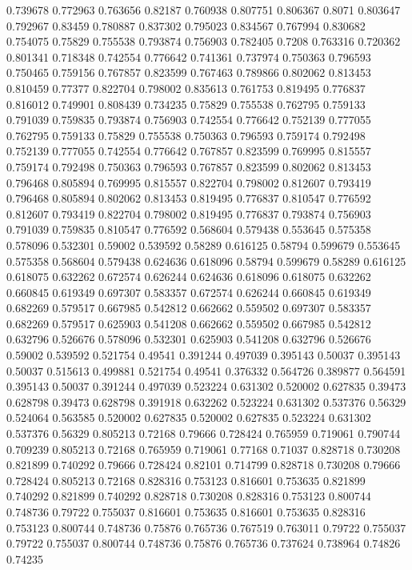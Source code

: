 0.739678 0.772963
0.763656 0.82187
0.760938 0.807751
0.806367 0.8071
0.803647 0.792967
0.83459 0.780887
0.837302 0.795023
0.834567 0.767994
0.830682 0.754075
0.75829 0.755538
0.793874 0.756903
0.782405 0.7208
0.763316 0.720362
0.801341 0.718348
0.742554 0.776642
0.741361 0.737974
0.750363 0.796593
0.750465 0.759156
0.767857 0.823599
0.767463 0.789866
0.802062 0.813453
0.810459 0.77377
0.822704 0.798002
0.835613 0.761753
0.819495 0.776837
0.816012 0.749901
0.808439 0.734235
0.75829 0.755538
0.762795 0.759133
0.791039 0.759835
0.793874 0.756903
0.742554 0.776642
0.752139 0.777055
0.762795 0.759133
0.75829 0.755538
0.750363 0.796593
0.759174 0.792498
0.752139 0.777055
0.742554 0.776642
0.767857 0.823599
0.769995 0.815557
0.759174 0.792498
0.750363 0.796593
0.767857 0.823599
0.802062 0.813453
0.796468 0.805894
0.769995 0.815557
0.822704 0.798002
0.812607 0.793419
0.796468 0.805894
0.802062 0.813453
0.819495 0.776837
0.810547 0.776592
0.812607 0.793419
0.822704 0.798002
0.819495 0.776837
0.793874 0.756903
0.791039 0.759835
0.810547 0.776592
0.568604 0.579438
0.553645 0.575358
0.578096 0.532301
0.59002 0.539592
0.58289 0.616125
0.58794 0.599679
0.553645 0.575358
0.568604 0.579438
0.624636 0.618096
0.58794 0.599679
0.58289 0.616125
0.618075 0.632262
0.672574 0.626244
0.624636 0.618096
0.618075 0.632262
0.660845 0.619349
0.697307 0.583357
0.672574 0.626244
0.660845 0.619349
0.682269 0.579517
0.667985 0.542812
0.662662 0.559502
0.697307 0.583357
0.682269 0.579517
0.625903 0.541208
0.662662 0.559502
0.667985 0.542812
0.632796 0.526676
0.578096 0.532301
0.625903 0.541208
0.632796 0.526676
0.59002 0.539592
0.521754 0.49541
0.391244 0.497039
0.395143 0.50037
0.395143 0.50037
0.515613 0.499881
0.521754 0.49541
0.376332 0.564726
0.389877 0.564591
0.395143 0.50037
0.391244 0.497039
0.523224 0.631302
0.520002 0.627835
0.39473 0.628798
0.39473 0.628798
0.391918 0.632262
0.523224 0.631302
0.537376 0.56329
0.524064 0.563585
0.520002 0.627835
0.520002 0.627835
0.523224 0.631302
0.537376 0.56329
0.805213 0.72168
0.79666 0.728424
0.765959 0.719061
0.790744 0.709239
0.805213 0.72168
0.765959 0.719061
0.77168 0.71037
0.828718 0.730208
0.821899 0.740292
0.79666 0.728424
0.82101 0.714799
0.828718 0.730208
0.79666 0.728424
0.805213 0.72168
0.828316 0.753123
0.816601 0.753635
0.821899 0.740292
0.821899 0.740292
0.828718 0.730208
0.828316 0.753123
0.800744 0.748736
0.79722 0.755037
0.816601 0.753635
0.816601 0.753635
0.828316 0.753123
0.800744 0.748736
0.75876 0.765736
0.767519 0.763011
0.79722 0.755037
0.79722 0.755037
0.800744 0.748736
0.75876 0.765736
0.737624 0.738964
0.74826 0.74235
